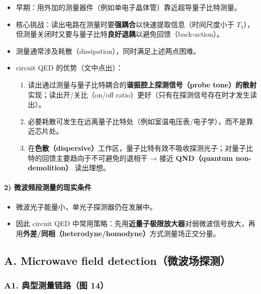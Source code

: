 \documentclass[12pt,a4paper,oneside]{ctexbook}
\providecommand{\tightlist}{%
  \setlength{\itemsep}{0pt}\setlength{\parskip}{0pt}}
\let\oldparagraph\paragraph
\renewcommand{\paragraph}[1]{\oldparagraph{#1}\mbox{}}
\begin{document}
\begin{itemize}
\tightlist
\item
  早期：用外加的测量器件（例如单电子晶体管）靠近超导量子比特测量。
\item
  核心挑战：读出电路在测量时要\textbf{强耦合}以快速提取信息（时间尺度小于
  \(T_1\)），但测量关闭时又要与量子比特\textbf{良好退耦}以避免回馈（back-action）。
\item
  测量通常涉及耗散（dissipation），同时满足上述两点困难。
\item
  circuit QED 的优势（文中点出）：

  \begin{enumerate}
  \def\labelenumi{\arabic{enumi}.}
  \tightlist
  \item
    读出通过测量与量子比特耦合的\textbf{谐振腔上探测信号（probe
    tone）的散射}实现；读出开/关比（on/off
    ratio）更好（只有在探测信号存在时才发生读出）。
  \item
    必要耗散可发生在远离量子比特处（例如室温电压表/电子学），而不是靠近芯片处。
  \item
    在\textbf{色散（dispersive）}工作区，量子比特有效不吸收探测光子；对量子比特的回馈主要趋向于不可避免的退相干
    → 接近 \textbf{QND（quantum non-demolition）} 读出理想。
  \end{enumerate}
\end{itemize}

\paragraph{2)
微波频段测量的现实条件}\label{ux5faeux6ce2ux9891ux6bb5ux6d4bux91cfux7684ux73b0ux5b9eux6761ux4ef6}

\begin{itemize}
\tightlist
\item
  微波光子能量小，单光子探测器仍在发展中。
\item
  因此 circuit QED
  中常用策略：先用\textbf{近量子极限放大器}对弱微波信号放大，再用\textbf{外差/同相（heterodyne/homodyne）}方式测量场正交分量。
\end{itemize}


\subsection{A. Microwave field
detection（微波场探测）}\label{a.-microwave-field-detectionux5faeux6ce2ux573aux63a2ux6d4b}

\subsubsection{A1. 典型测量链路（图
14）}\label{a1.-ux5178ux578bux6d4bux91cfux94feux8defux56fe-14}
\end{document}
